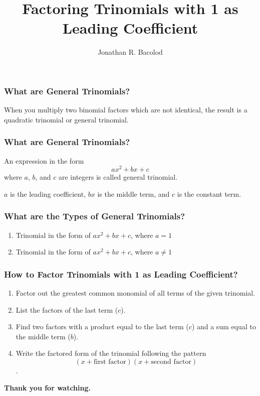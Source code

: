 \documentclass[14pt]{beamer}
\title[] {Factoring Trinomials with 1 as Leading Coefficient}
\author{Jonathan R. Bacolod}
\institute[SHS]{Sauyo High School}
\date{}
\begin{document}
	\frame{\titlepage}
	
	\begin{frame}
		\frametitle{What are General Trinomials?}
		When you multiply two binomial factors which are not
		identical, the result is a quadratic trinomial or general trinomial.
	\end{frame}
	
	\begin{frame}
		\frametitle{What are General Trinomials?}
		An expression in the form $$ ax^2 + bx + c $$ where $ a $, $ b $, and $ c $ are integers is called general trinomial.
		
		$ a $ is the leading coefficient, $ bx $ is the middle term, and $ c $ is the constant term.
	\end{frame}

    \begin{frame}
    	\frametitle{What are the Types of General Trinomials?}
    	
    	\begin{enumerate}
    		\item<1-> Trinomial in the form of $ ax^2 + bx + c $, where $ a=1 $
    		\item<2-> Trinomial in the form of $ ax^2 + bx + c $, where $ a \neq 1 $
    	\end{enumerate}
    \end{frame}
	
    \begin{frame}
    	\frametitle{How to Factor Trinomials with 1 as Leading Coefficient?}
    	\begin{enumerate}
    		\item<1-> Factor out the greatest common monomial of all terms of the given trinomial.
    		\item<2-> List the factors of the last term ($ c $).
    		\item<3-> Find two factors with a product equal to the last term ($ c $) and a sum equal to the middle term ($ b $).
    		\item<4-> Write the factored form of the trinomial following the pattern $$(x+ \text{first factor}) (x+ \text{second factor})$$.
    	\end{enumerate}
    \end{frame}

    \begin{frame}
    	\begin{center}
    		\textbf{\LARGE Thank you for watching.}
    	\end{center}
    \end{frame}
	
\end{document}
